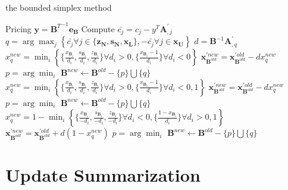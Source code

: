 \documentclass{article}
\begin{document}
\begin{algorithm}
\caption{the bounded simplex method}

Pricing $\mathbf{y} = {\mathbf{B}^T}^{-1}\mathbf{e_B}$\;
Compute $\bar{c_j} = c_j - y^T\mathbf{A}_{,j}^{'}$\;
{
    $q = \arg\max_{j} \left\{\bar{c_j} \forall j\in\{\mathbf{z_N}, \mathbf{s_N}, \mathbf{x_L}  \},-\bar{c_j} \forall j\in\mathbf{x_U}  \right\}$\;
    $d = \mathbf{B}^{-1}\mathbf{A}_{,q}^{'}$\;
    {
        $x_q^{new} = \min_i \left\{\{\frac{x_{\mathbf{B}_{i}}}{d_i}, \frac{s_{\mathbf{B}_{i}}}{d_i}, \frac{z_{\mathbf{B}_{i}}}{d_i}\} \forall d_i>0,\{\frac{x_{\mathbf{B}_{i}}-1}{d_i}\} \forall d_i<0\right\}$\;
        $\mathbf{x}_{\mathbf{B}^{old}}^{'new} = \mathbf{x}_{\mathbf{B}^{old}}^{'old} - dx_q^{new}$\;
        $p=\arg\min_{i}$\;
        $\mathbf{B}^{new} \leftarrow \mathbf{B}^{old} - \{p\} \bigcup \{q\}$\;
    }
    {
        $x_q^{new} = \min_i \left\{\{\frac{x_{\mathbf{B}_{i}}}{d_i}, \frac{s_{\mathbf{B}_{i}}}{d_i}, \frac{z_{\mathbf{B}_{i}}}{d_i}\} \forall d_i>0, \{\frac{x_{\mathbf{B}_{i}}-1}{d_i}\} \forall d_i<0, 1 \right\}$\;
        $\mathbf{x}_{\mathbf{B}^{old}}^{'new} = \mathbf{x}_{\mathbf{B}^{old}}^{'old} - dx_q^{new}$\; 
        {
            $p=\arg\min_{i}$\;
            $\mathbf{B}^{new} \leftarrow \mathbf{B}^{old} - \{p\} \bigcup \{q\}$\;
        }
    }
    {
        $x_q^{new} = 1 - \min_i \left\{\{\frac{x_{\mathbf{B}_{i}}}{-d_i}, \frac{s_{\mathbf{B}_{i}}}{-d_i}, \frac{z_{\mathbf{B}_{i}}}{-d_i}\} \forall d_i<0, \{\frac{1-x_{\mathbf{B}_{i}}}{d_i}\} \forall d_i>0, 1 \right\}$\;
        $\mathbf{x}_{\mathbf{B}^{old}}^{'new} = \mathbf{x}_{\mathbf{B}^{old}}^{'old} + d(1-x_q^{new})$\;
        {
            $p=\arg\min_{i}$\;
            $\mathbf{B}^{new} \leftarrow \mathbf{B}^{old} - \{p\} \bigcup \{q\}$\;
        }
    }
}

\end{algorithm}


\section{Update Summarization}
\end{document}
